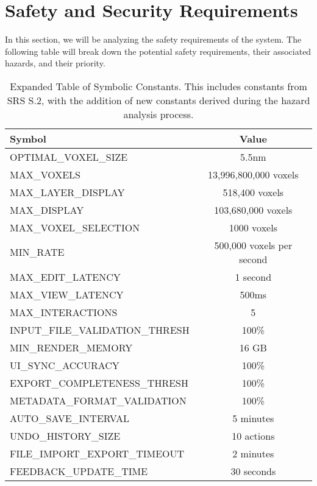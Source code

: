 \documentclass{article}
\begin{document}
\section{Safety and Security Requirements}

In this section, we will be analyzing the safety requirements of the system. The following table will break down the potential safety requirements, their associated hazards, and their priority.

\begin{table}[H]
    \centering
    \renewcommand{\arraystretch}{1.2}
    \begin{tabular}{|l|c|}
        \toprule \textbf{Symbol} & \textbf{Value} \\
        \midrule
        OPTIMAL\_VOXEL\_SIZE & 5.5nm \\
        MAX\_VOXELS & 13,996,800,000 voxels \\
        MAX\_LAYER\_DISPLAY & 518,400 voxels \\
        MAX\_DISPLAY & 103,680,000 voxels \\
        MAX\_VOXEL\_SELECTION & 1000 voxels \\
        MIN\_RATE & 500,000 voxels per second \\
        MAX\_EDIT\_LATENCY & 1 second \\
        MAX\_VIEW\_LATENCY & 500ms \\
        MAX\_INTERACTIONS & 5\\
        INPUT\_FILE\_VALIDATION\_THRESH & 100\% \\
        MIN\_RENDER\_MEMORY & 16 GB \\
        UI\_SYNC\_ACCURACY & 100\% \\
        EXPORT\_COMPLETENESS\_THRESH & 100\% \\
        METADATA\_FORMAT\_VALIDATION & 100\% \\
        AUTO\_SAVE\_INTERVAL & 5 minutes \\
        UNDO\_HISTORY\_SIZE & 10 actions \\
        FILE\_IMPORT\_EXPORT\_TIMEOUT &  2 minutes \\
        FEEDBACK\_UPDATE\_TIME & 30 seconds \\
        \bottomrule
    \end{tabular}
    \caption{Expanded Table of Symbolic Constants. This includes constants from SRS S.2, with the addition of new constants derived during the hazard analysis process.}
    \label{tab:sym}
\end{table}
\end{document}
